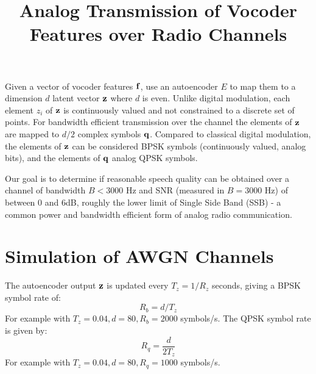 \documentclass{article}
\begin{document}
\title{Analog Transmission of Vocoder Features over Radio Channels}
\maketitle

Given a vector of vocoder features $\bf{f}$, use an autoencoder $E$ to map them to a dimension $d$ latent vector $\bf{z}$ where $d$ is even.  Unlike digital modulation, each element $z_i$ of $\bf{z}$ is continuously valued and not constrained to a discrete set of points.  For bandwidth efficient transmission over the channel the elements of $\bf{z}$ are mapped to $d/2$ complex symbols $\bf{q}$. Compared to classical digital modulation, the elements of $\bf{z}$ can be considered BPSK symbols (continuously valued, analog bits), and the elements of $\bf{q}$ analog QPSK symbols.

Our goal is to determine if reasonable speech quality can be obtained over a channel of bandwidth $B<3000$ Hz and SNR (measured in $B=3000$ Hz) of between 0 and 6dB, roughly the lower limit of Single Side Band (SSB) - a common power and bandwidth efficient form of analog radio communication.

\section{Simulation of AWGN Channels}

The autoencoder output $\bf{z}$ is updated every $T_z=1/R_z$ seconds, giving a BPSK symbol rate of:
\begin{equation}
R_b=d/T_z
\end{equation}
For example with $T_z=0.04, d=80, R_b=2000$ symbols/s.  The QPSK symbol rate is given by:
\begin{equation}
R_q = \frac{d}{2T_z} 
\end{equation}
For example with $T_z=0.04, d=80, R_q=1000$ symbols/s.
\end{document}

